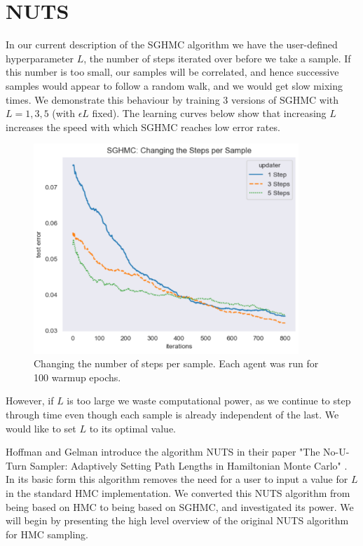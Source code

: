 \section{NUTS}

In our current description of the SGHMC algorithm we have the user-defined hyperparameter $L$, the number of steps iterated over before we take a sample. If this number is too small, our samples will be correlated, and hence successive samples would appear to follow a random walk, and we would get slow mixing times. We demonstrate this behaviour by training 3 versions of SGHMC with $L=1,3,5$ (with $\epsilon L$ fixed). The learning curves below show that increasing $L$ increases the speed with which SGHMC reaches low error rates.

\begin{figure}[h!]
\centering
\includegraphics[width=100mm]{parts/Images/changing_num_steps.png}
\caption{Changing the number of steps per sample. Each agent was run for 100 warmup epochs.}
\end{figure}

However, if $L$ is too large we waste computational power, as we continue to step through time even though each sample is already independent of the last. We would like to set $L$ to its optimal value.

Hoffman and Gelman introduce the algorithm NUTS in their paper "The No-U-Turn Sampler: Adaptively Setting Path Lengths in Hamiltonian Monte Carlo" \cite{nuts}. In its basic form this algorithm removes the need for a user to input a value for $L$ in the standard HMC implementation. We converted this NUTS algorithm from being based on HMC to being based on SGHMC, and investigated its power. We will begin by presenting the high level overview of the original NUTS algorithm for HMC sampling.

